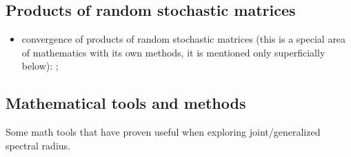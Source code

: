 \documentclass[a4paper,fleqn]{article}
\let\cite=\citep
\begin{document}
\subsection*{Products of random stochastic matrices}
\begin{itemize}

\item convergence of products of random stochastic matrices (this is a special area of mathematics with its own methods, it is mentioned only superficially below): \cite{AT:JMAA77, BXMS:IEEETSP13, Cohn:IJMMS, CMS:LAA21, CMMS:EJP23, DHH:ArXiv14, DHX:AUT11, OgurMart:LAA13, Leiz:LAA92, LimaRah:JPA94, Prot:MS11, Thomas:ArXiv11, Thomas:ArXiv13, Wolf:PAMS};
\end{itemize}

\subsection*{Mathematical tools and methods}
Some math tools that have proven useful when exploring joint/generalized spectral radius.
\end{document}
